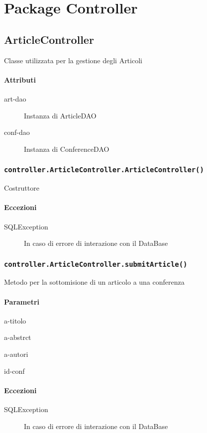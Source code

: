 \section{Package Controller}
\label{sec:package_controller}

\subsection{ArticleController}
Classe utilizzata per la gestione degli Articoli
\paragraph{Attributi}
\begin{description}
\item[art-dao] Instanza di ArticleDAO
\item[conf-dao] Instanza di ConferenceDAO
\end{description}

\subsubsection{\texttt{controller.ArticleController.ArticleController()}}
Costruttore
\paragraph{Eccezioni}
\begin{description}
\item[SQLException] In caso di errore di interazione con il DataBase
\end{description}

\subsubsection{\texttt{controller.ArticleController.submitArticle()}}
Metodo per la sottomisione di un articolo a una conferenza
\paragraph{Parametri}
\begin{description}
\item a-titolo
\item a-abstrct
\item a-autori
\item id-conf
\end{description}
\paragraph{Eccezioni}
\begin{description}
\item[SQLException] In caso di errore di interazione con il DataBase
\end{description}
